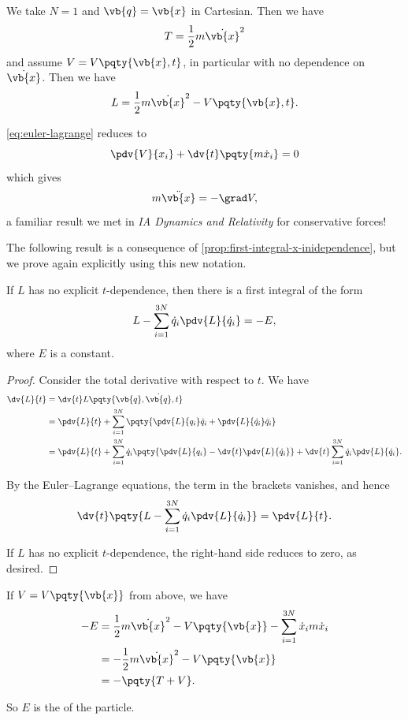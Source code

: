 \begin{example}
    We take \(N = 1\) and \(\vb{q} = \vb{x}\) in Cartesian. Then we have
    \[
        T = \frac{1}{2} m \dot{\vb{x}}^2
    \]
    and assume \(V = V \pqty{\vb{x}, t}\), in particular with no dependence on \(\dot{\vb{x}}\). Then we have
    \[
        L = \frac{1}{2} m \dot{\vb{x}}^2 - V \pqty{\vb{x}, t}.
    \]

    \eqref{eq:euler-lagrange} reduces to
    \[
        \pdv{V}{x_i} + \dv{t} \pqty{m \dot{x}_i} = 0
    \]
    which gives
    \[
        m \ddot{\vb{x}} = - \grad V,
    \]
    a familiar result we met in \textit{IA Dynamics and Relativity} for conservative forces!
\end{example}

The following result is a consequence of \autoref{prop:first-integral-x-inidependence}, but we prove again explicitly using this new notation.

\begin{proposition}
    \label{prop:time-independence-conserved-energy}%
    If \(L\) has no explicit \(t\)-dependence, then there is a first integral of the form
    \[
        L - \sum_{i = 1}^{3N} \dot{q}_i \pdv{L}{\dot{q}_i} = - E,
    \]
    where \(E\) is a constant.
\end{proposition}

\begin{proof}
    Consider the total derivative with respect to \(t\). We have
    \begin{align*}
        \dv{L}{t} &= \dv{t} L\pqty{\vb{q}, \dot{\vb{q}}, t} \\
        &= \pdv{L}{t} + \sum_{i = 1}^{3N} \pqty{\pdv{L}{q_i} \dot{q}_i + \pdv{L}{\dot{q}_i} \ddot{q}_i} \\
        &= \pdv{L}{t} + \sum_{i = 1}^{3N} \dot{q}_i \pqty{\pdv{L}{q_i} - \dv{t} \pdv{L}{\dot{q}_i}} + \dv{t} \sum_{i = 1}^{3N} \dot{q}_i \pdv{L}{\dot{q}_i}.
    \end{align*}

    By the Euler--Lagrange equations, the term in the brackets vanishes, and hence
    \[
        \dv{t} \pqty{L - \sum_{i = 1}^{3N} \dot{q}_i \pdv{L}{\dot{q}_i}} = \pdv{L}{t}.
    \]

    If \(L\) has no explicit \(t\)-dependence, the right-hand side reduces to zero, as desired.
\end{proof}

\begin{example}
    If \(V = V\pqty{\vb{x}}\) from above, we have
    \begin{align*}
        -E &= \frac{1}{2} m \dot{\vb{x}}^2 - V\pqty{\vb{x}} - \sum_{i = 1}^{3N} \dot{x}_i m \dot{x}_i \\
        &= - \frac{1}{2} m \dot{\vb{x}}^2 - V\pqty{\vb{x}} \\
        &= - \pqty{T + V}.
    \end{align*}

    So \(E\) is the  of the particle.
\end{example}

